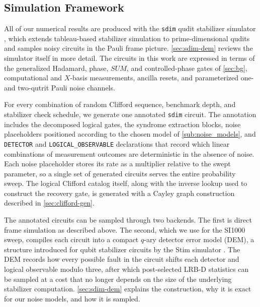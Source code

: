 \subsection{Simulation Framework}
\label{sub:sim_framework}

All of our numerical results are produced with the \texttt{sdim} qudit stabilizer simulator \cite{sdim}, which extends tableau-based stabilizer simulation to prime-dimensional qudits and samples noisy circuits in the Pauli frame picture. \autoref{sec:sdim-dem} reviews the simulator itself in more detail. The circuits in this work are expressed in terms of the generalized Hadamard, phase, $SUM$, and controlled-phase gates of \autoref{sec:bg}, computational and $X$-basis measurements, ancilla resets, and parameterized one- and two-qutrit Pauli noise channels.

For every combination of random Clifford sequence, benchmark depth, and stabilizer check schedule, we generate one annotated \texttt{sdim} circuit. The annotation includes the decomposed logical gates, the syndrome extraction blocks, noise placeholders positioned according to the chosen model of \autoref{sub:noise_models}, and \texttt{DETECTOR} and \texttt{LOGICAL\_OBSERVABLE} declarations that record which linear combinations of measurement outcomes are deterministic in the absence of noise. Each noise placeholder stores its rate as a multiplier relative to the swept parameter, so a single set of generated circuits serves the entire probability sweep. The logical Clifford catalog itself, along with the inverse lookup used to construct the recovery gate, is generated with a Cayley graph construction described in \autoref{sec:clifford-gen}.

The annotated circuits can be sampled through two backends. The first is direct frame simulation as described above. The second, which we use for the SI1000 sweep, compiles each circuit into a compact $q$-ary detector error model (DEM), a structure introduced for qubit stabilizer circuits by the Stim simulator \cite{Gidney2021Stim}. The DEM records how every possible fault in the circuit shifts each detector and logical observable modulo three, after which post-selected LRB-D statistics can be sampled at a cost that no longer depends on the size of the underlying stabilizer computation. \autoref{sec:sdim-dem} explains the construction, why it is exact for our noise models, and how it is sampled.
